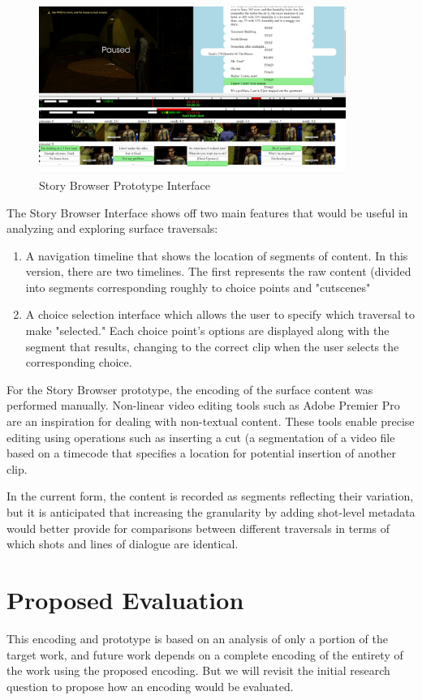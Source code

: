 \documentclass{llncs}
\begin{document}
\begin{figure}[htb]
\centering
\includegraphics[width=10cm]{story_browser.png}
\caption{Story Browser Prototype Interface}
\end{figure}

The Story Browser Interface shows off two main features that would be
useful in analyzing and exploring surface traversals:

\begin{enumerate}
\item A navigation timeline that shows the location of segments of
content. In this version, there are two timelines. The first
represents the raw content (divided into segments corresponding
roughly to choice points and "cutscenes"
\item A choice selection interface which allows the user to specify which
traversal to make "selected." Each choice point's options are
displayed along with the segment that results, changing to the
correct clip when the user selects the corresponding choice.
\end{enumerate}

For the Story Browser prototype, the encoding of the surface content
was performed manually. Non-linear video editing tools such as Adobe
Premier Pro are an inspiration for dealing with non-textual
content. These tools enable precise editing using operations such as
inserting a cut (a segmentation of a video file based on a timecode
that specifies a location for potential insertion of another clip.

In the current form, the content is recorded as segments reflecting
their variation, but it is anticipated that increasing the granularity
by adding shot-level metadata would better provide for comparisons
between different traversals in terms of which shots and lines of
dialogue are identical.

\section{Proposed Evaluation}
\label{sec:orgheadline16}
This encoding and prototype is based on an analysis of only a portion
of the target work, and future work depends on a complete encoding of
the entirety of the work using the proposed encoding. But we will
revisit the initial research question to propose how an encoding would
be evaluated.
\end{document}
